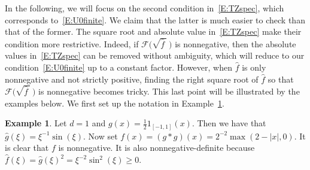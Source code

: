 \documentclass[a4paper,11pt]{article}%
\theoremstyle{plain}
\theoremstyle{definition}
\newtheorem{example}[theorem]{Example}
\numberwithin{equation}{section}
\newcommand{\R}{\mathbb{R}}
\begin{document}
In the following, we will focus on the second condition in~\eqref{E:TZspec}, which corresponds
to~\eqref{E:U0finite}. We claim that the latter is much easier to check than that of the former. The
square root and absolute value in~\eqref{E:TZspec} make their condition more restrictive. Indeed, if
$\mathcal{F}\big(\sqrt{\widehat{f}\:}\:\big)$ is nonnegative, then the absolute values
in~\eqref{E:TZspec} can be removed without ambiguity, which will reduce to our
condition~\eqref{E:U0finite} up to a constant factor. However, when $\widehat{f}$ is only
nonnegative and not strictly positive, finding the right square root of $\widehat{f}$ so that
$\mathcal{F}\big(\sqrt{\widehat{f}\:}\:\big)$ is nonnegative becomes tricky. This last point will be
illustrated by the examples below. We first set up the notation in Example~\ref{Ex:nonnegative}.
%
%



\begin{example}\label{Ex:nonnegative}
  Let $d = 1$ and $g(x) = \frac{1}{2}1_{[-1,1]}(x)$. Then we have that $ \widehat{g}(\xi) =
  \xi^{-1}\sin(\xi)$. Now set $f(x) = \left(g*g\right)(x) = 2^{-2}\max(2-|x|,0)$. It is clear that
  $f$ is nonnegative. It is also nonnegative-definite because $\widehat{f}(\xi) = \widehat{g}(\xi)^2
  = \xi^{-2}\sin^2 (\xi)\ge 0$.
\end{example}

\end{document}
